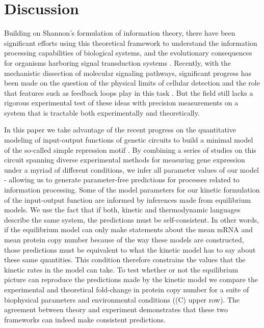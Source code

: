 \section*{Discussion}

Building on Shannon's formulation of information theory, there have been
significant efforts using this theoretical framework to understand the
information processing capabilities of biological systems, and the evolutionary
consequences for organisms harboring signal transduction systems
\cite{Bergstrom2004, Taylor2007, Tkacik2008, Polani2009, Nemenman2010,
Rivoire2011}. Recently, with the mechanistic dissection of molecular signaling
pathways, significant progress has been made on the question of the physical
limits of cellular detection and the role that features such as feedback loops
play in this task \cite{Bialek2005, Libby2007, Tkacik2011, Rhee2012a,
Voliotis2014a}. But the field still lacks a rigorous experimental test of these
ideas with precision measurements on a system that is tractable both
experimentally and theoretically.

In this paper we take advantage of the recent progress on the quantitative
modeling of input-output functions of genetic circuits to build a minimal model
of the so-called simple repression motif \cite{Phillips2019}. By combining a
series of studies on this circuit spanning diverse experimental methods for
measuring gene expression under a myriad of different conditions, we infer all
parameter values of our model - allowing us to generate parameter-free
predictions for processes related to information processing. Some of the model
parameters for our kinetic formulation of the input-output function are
informed by inferences made from equilibrium models. We use the fact that if
both, kinetic and thermodynamic languages describe the same system, the
predictions must be self-consistent. In other words, if the equilibrium model
can only make statements about the mean mRNA and mean protein copy number
because of the way these models are constructed, those predictions must be
equivalent to what the kinetic model has to say about these same quantities.
This condition therefore constrains the values that the kinetic rates in the
model can take. To test whether or not the equilibrium picture can reproduce
the predictions made by the kinetic model we compare the experimental and
theoretical fold-change in protein copy number for a suite of biophysical
parameters and environmental conditions ((C) upper row).
The agreement between theory and experiment demonstrates that these two
frameworks can indeed make consistent predictions.

